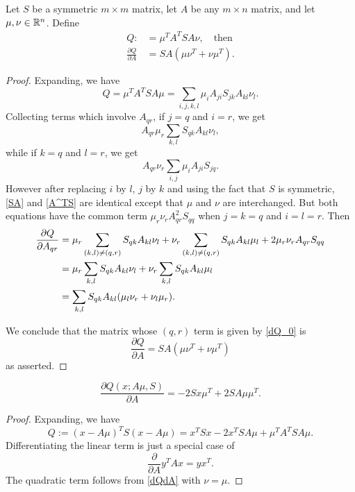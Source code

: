 \documentclass[12pt,leqno]{article}
\begin{document}
\begin{Lem}\label{dQdA}
  Let $S$ be a symmetric $m\times{m}$ matrix, let $A$ be any $m\times{n}$ matrix,
  and let $\mu,\nu\in {\mathbb R}^n$.  Define
  \begin{align*}
  Q :&= \mu^TA^TSA\nu,\quad\text{then}\\
  \frac{\partial{Q}}{\partial{A}} &= SA(\mu\nu^T+\nu\mu^T).
  \end{align*}
\end{Lem}
\begin{proof}
Expanding, we have
$$
Q = \mu^TA^TSA\mu = \sum_{i,j,k,l}\mu_iA_{ji}S_{jk}A_{kl}\nu_l.
$$
Collecting terms which involve $A_{qr}$, if $j=q$ and $i=r$, we get
\begin{equation}\label{SA}
A_{qr}\mu_r\sum_{k,l}S_{qk}A_{kl}\nu_l,
\end{equation}
while if $k=q$ and $l=r$, we get
\begin{equation}\label{A^TS}
A_{qr}\nu_r\sum_{i,j}\mu_iA_{ji}S_{jq}.
\end{equation}
However after replacing $i$ by $l$, $j$ by $k$ and using the fact that $S$ is symmetric,
\eqref{SA} and \eqref{A^TS} are identical except that $\mu$ and $\nu$ are interchanged.
But both equations have the common term
$\mu_r\nu_rA_{qr}^2S_{qq}$ when $j = k = q$ and $i = l = r$.
Then
\begin{align}
  \notag\frac{\partial{Q}}{\partial{A_{qr}}} &= \mu_r\sum_{(k,l)\neq(q,r)}S_{qk}A_{kl}\nu_l
  +\nu_r\sum_{(k,l)\neq(q,r)}S_{qk}A_{kl}\mu_l+ 2\mu_r\nu_rA_{qr}S_{qq}\\
  &= \mu_r\sum_{k,l}S_{qk}A_{kl}\nu_l + \nu_r\sum_{k,l}S_{qk}A_{kl}\mu_l\notag\\
  &= \sum_{k,l}S_{qk}A_{kl}(\mu_l\nu_r + \nu_l\mu_r).\label{dQ_0}
\end{align}

We conclude that the matrix whose $(q,r)$ term is given by \eqref{dQ_0} is
$$
\frac{\partial{Q}}{\partial{A}} = SA(\mu\nu^T+\nu\mu^T)
$$
as asserted.
\end{proof}

\begin{Cor}\label{dM}
  $$
  \frac{\partial{Q(x;A\mu,S)}}{\partial{A}} = -2Sx\mu^T + 2SA\mu\mu^T.
  $$
\end{Cor}
\begin{proof}
Expanding, we have
$$
Q := (x-A\mu)^TS(x-A\mu) = x^TSx - 2x^TSA\mu + \mu^TA^TSA\mu.
$$
Differentiating the linear term is just a special case of
$$
\frac{\partial}{\partial{A}}y^TAx = yx^T.
$$
The quadratic term follows from \eqref{dQdA} with $\nu = \mu$.
\end{proof}
\end{document}
